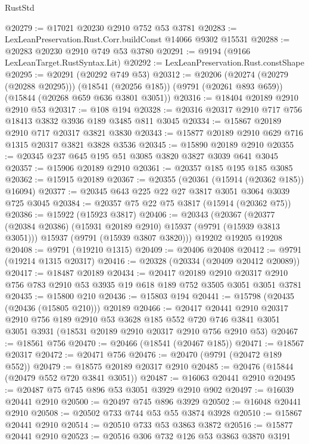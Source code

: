 \begin{lexlean}{RustStd}
\begin{coremodule}
@20279 := @17021 @20230 @2910 @752 @53 @3781
@20283 := LexLeanPreservation.Rust.Corr.buildConst @14066 @9302 @15531
@20288 := @20283 @20230 @2910 @749 @53 @3780
@20291 := @9194 (@9166 LexLeanTarget.RustSyntax.Lit)
@20292 := LexLeanPreservation.Rust.constShape
@20295 := @20291 (@20292 @749 @53)
@20312 := @20206
    (@20274 (@20279 (@20288 @20295)))
    (@18541 (@20256 @185))
    (@9791 (@20261 @893 @659))
    (@15844 (@20268 @659 @636 @3801 @3051))
@20316 := @18404 @20189 @2910 @2910 @53
@20317 := @108 @194
@20328 := @20316 @20317 @2910 @717 @756 @18413 @3832 @3936 @189 @3485 @811 @3045
@20334 := @15867 @20189 @2910 @717 @20317 @3821 @3830
@20343 := @15877 @20189 @2910 @629 @716 @1315 @20317 @3821 @3828 @3536
@20345 := @15890 @20189 @2910
@20355 := @20345 @237 @645 @195 @51 @3085 @3820 @3827 @3039 @641 @3045
@20357 := @15906 @20189 @2910
@20361 := @20357 @185 @195 @185 @3085
@20362 := @15915 @20189
@20367 := @20355 (@20361 (@15914 (@20362 @185)) @16094)
@20377 := @20345 @643 @225 @22 @27 @3817 @3051 @3064 @3039 @725 @3045
@20384 := @20357 @75 @22 @75 @3817 (@15914 (@20362 @75))
@20386 := @15922 (@15923 @3817)
@20406 := @20343
    (@20367
      (@20377 (@20384 @20386) (@15931 @20189 @2910) @15937 (@9791 (@15939 @3813 @3051)))
      @15937
      (@9791 (@15939 @3807 @3820)))
    @19202
    @19205
    @19208
@20408 := @9791 (@19210 @1315)
@20409 := @20406 @20408
@20412 := @9791 (@19214 @1315 @20317)
@20416 := @20328 (@20334 (@20409 @20412 @20089))
@20417 := @18487 @20189
@20434 := @20417
    @20189
    @2910
    @20317
    @2910
    @756
    @783
    @2910
    @53
    @3935
    @19
    @618
    @189
    @752
    @3505
    @3051
    @3051
    @3781
@20435 := @15800 @210
@20436 := @15803 @194
@20441 := @15798 (@20435 (@20436 (@15805 @210))) @20189
@20466 := @20417
    @20441
    @2910
    @20317
    @2910
    @756
    @189
    @2910
    @53
    @3628
    @185
    @552
    @720
    @746
    @3841
    @3051
    @3051
    @3931
    (@18531 @20189 @2910 @20317 @2910 @756 @2910 @53)
@20467 := @18561 @756
@20470 := @20466 (@18541 (@20467 @185))
@20471 := @18567 @20317
@20472 := @20471 @756
@20476 := @20470 (@9791 (@20472 @189 @552))
@20479 := @18575 @20189 @20317 @2910
@20485 := @20476 (@15844 (@20479 @552 @720 @3841 @3051))
@20487 := @16063 @20441 @2910
@20495 := @20487 @75 @745 @896 @53 @3051 @3929 @2910 @902
@20497 := @16039 @20441 @2910
@20500 := @20497 @745 @896 @3929
@20502 := @16048 @20441 @2910
@20508 := @20502 @733 @744 @53 @55 @3874 @3928
@20510 := @15867 @20441 @2910
@20514 := @20510 @733 @53 @3863 @3872
@20516 := @15877 @20441 @2910
@20523 := @20516 @306 @732 @126 @53 @3863 @3870 @3191

\end{coremodule}
\end{lexlean}
